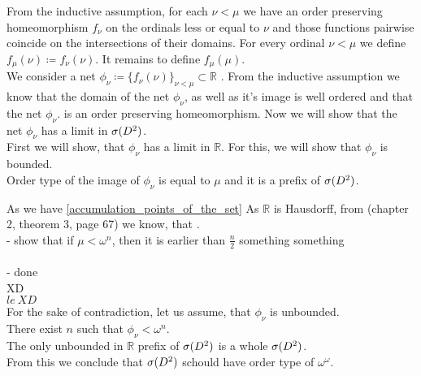 From the inductive assumption, for each $\nu < \mu$ we have an order preserving homeomorphism 
$f_\nu$ on the ordinals less or equal to $\nu$ and those functions pairwise coincide 
on the intersections 
of their domains. For every ordinal $\nu < \mu$ we define 
$f_\mu(\nu) \coloneqq f_\nu(\nu)$. It remains to define $f_\mu(\mu)$. \\
We consider a net $\phi_\nu \coloneqq \{f_\nu(\nu)\}_{\nu<\mu} \subset \mathbb{R}$
. From the inductive assumption we know that the domain of the net $\phi_\nu$, as 
well as it's image is well ordered and that the net $\phi_\nu$.  
is an order preserving homeomorphism.
Now we will show that the net $\phi_\nu$ has a limit in ${{\sigma}(D^2)}$. \\
First we will show, that $\phi_\nu$ has a limit in $\mathbb{R}$. For this, we will show that 
$\phi_\nu$ is bounded. \\
Order type of the image of $\phi_\nu$ is equal to $\mu$ and it is a prefix of ${{\sigma}(D^2)}$. 

As we have \ref{accumulation_points_of_the_set} 
As $\mathbb{R}$ is Hausdorff, from \cite{Kelley1975} (chapter 2, 
theorem 3, page 67) we know, that .  
\\ 
- show that if $\mu < \omega^n$, then it is earlier than $\frac{n}{2}$ something something\\
\smalltodo 
\\
- done\\
XD \\
$le\ XD$ \\ 
For the sake of contradiction, let us assume, that $\phi_\nu$ is unbounded. \\
There exist $n$ such that $\phi_\nu < \omega^n$. \\
The only unbounded in $\mathbb{R}$ prefix of ${{\sigma}(D^2)}$ is a whole ${{\sigma}(D^2)}$. \\ 
From this we conclude that ${{\sigma}(D^2)}$ schould have order type of $\omega^\omega$.
\\ 



